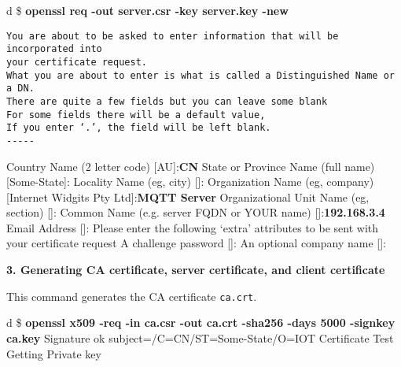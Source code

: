 \documentclass[a4paper,12pt]{book}
\begin{document}
\begin{codebloc}
\begin{tabular}{d}
\$ \textbf{openssl req -out server.csr -key server.key -new}
\begin{verbatim}
You are about to be asked to enter information that will be incorporated into
your certificate request.
What you are about to enter is what is called a Distinguished Name or a DN.
There are quite a few fields but you can leave some blank
For some fields there will be a default value,
If you enter ‘.’, the field will be left blank.
-----
\end{verbatim}
Country Name (2 letter code) [AU]:\textbf{CN}\newline
State or Province Name (full name) [Some-State]:\newline
Locality Name (eg, city) []:\newline
Organization Name (eg, company) [Internet Widgits Pty Ltd]:\textbf{MQTT Server}\newline
Organizational Unit Name (eg, section) []:\newline
Common Name (e.g. server FQDN or YOUR name) []:\textbf{192.168.3.4}\newline
Email Address []:\newline
\vspace{10pt}
Please enter the following ‘extra’ attributes\newline
to be sent with your certificate request\newline
A challenge password []:\newline
An optional company name []:
\end{tabular}
\end{codebloc}

\vspace{6pt}
\textbf{3.	Generating CA certificate, server certificate, and client certificate}

This command generates the CA certificate \verb|ca.crt|.

\begin{codebloc}
\begin{tabular}{d}
\$ \textbf{openssl x509 -req -in ca.csr -out ca.crt -sha256 -days 5000 -signkey ca.key}\newline
Signature ok\newline
subject=/C=CN/ST=Some-State/O=IOT Certificate Test\newline
Getting Private key
\end{tabular}
\end{codebloc}
\end{document}
